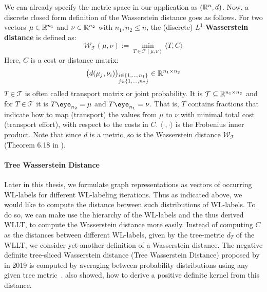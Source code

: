 		We can already specify the metric space in our application as $(\mathbb{R}^{n}, d)$.
		Now, a discrete closed form definition of the Wasserstein distance goes as follows.
		For two vectors $\mu \in \mathbb{R}^{n_1}$ and $\nu\in\mathbb{R}^{n_2}$ with $n_1, n_2\le n$, the (discrete) $L^1$-\textbf{Wasserstein distance} is defined as:
		\begin{equation} \label{eq:discreteWassDist}
			\mathcal{W}_\mathcal{T}(\mu, \nu) := \min\limits_{T\in\mathcal{T}(\mu,\nu)} \langle T,C\rangle
		\end{equation}
		Here, $C$ is a cost or distance matrix:
		\[ \big(d(\mu_j,\nu_i)\big)_{\begin{subarray}{l}
			i\in\{1,\dots, n_1\}\\
			j\in\{1,\dots, n_2\}
			\end{subarray}} \in\mathbb{R}^{n_1\times n_2} \]
		$T\in\mathcal{T}$ is often called transport matrix or joint probability.
		It is $\mathcal{T}\subseteq \mathbb{R}^{n_1\times n_2}$ and for $T\in\mathcal{T}$ it is $T\eye_{n_2}=\mu$ and $T\eye_{n_1}=\nu$.
		That is, $T$ contains fractions that indicate how to map (transport) the values from $\mu$ to $\nu$ with minimal total cost (transport effort), with respect to the costs in $C$.
		$\langle\cdot,\cdot\rangle$ is the Frobenius inner product.
		Note that since $d$ is a metric, so is the Wasserstein distance $\mathcal{W}_\mathcal{T}$ (Theorem 6.18 in \cite{2009_Villani_BOOK}).
		
		\paragraph{Tree Wasserstein Distance}
		Later in this thesis, we formulate graph representations as vectors of occurring WL-labels for different WL-labeling iterations.
		Thus as indicated above, we would like to compute the distance between such distributions of WL-labels.
		To do so, we can make use the hierarchy of the WL-labels and the thus derived WLLT, to compute the Wasserstein distance more easily.
		Instead of computing $C$ as the distances between different WL-labels, given by the tree-metric $d_T$ of the WLLT, we consider yet another definition of a Wasserstein distance.
		The negative definite tree-sliced Wasserstein distance (Tree Wasserstein Distance) proposed by \citeauthor{2019_Le_NIPS} in 2019 is computed by averaging between probability distributions using any given tree metric~\cite{2019_Le_NIPS}.
		\citeauthor{2019_Le_NIPS} also showed, how to derive a positive definite kernel from this distance.
		
